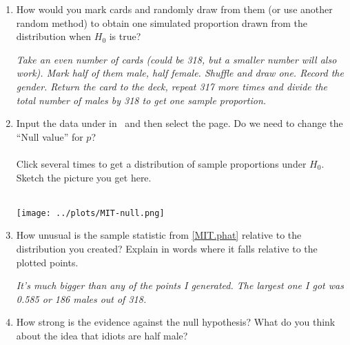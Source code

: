 \begin{enumerate}
\begin{enumerate}
\begin{key}
\end{key}
    \item How would you mark cards and randomly draw from them (or use
      another random method) to
      obtain one simulated proportion drawn from the distribution when
      $H_0$ is true?
\begin{students}
    \vspace{3cm}    
\end{students}
\begin{key} 
  {\it Take an even number of cards (could be 318, but a
    smaller number will also work). Mark half of them male, half
    female. Shuffle and draw one. Record the gender. Return the card
    to the deck, repeat 317 more times and divide the total number of
    males by 318 to get one sample proportion.}
\end{key}
    \item Input the data under  in 
      \webAppURLFrst\ 
      and then select the   page.  Do we need to change the
      ``Null value'' for $p$?\\ \ \\
      Click  several times to get a distribution of sample
      proportions under $H_0$. 
      Sketch the picture you get here.
\begin{students}
    \vspace{5cm}    
\end{students}
\begin{key}
\ \  \\ \texttt{[image: ../plots/MIT-null.png]}
\end{key}
  \item How unusual is the sample statistic from \ref{MIT.phat}
    relative to the distribution you created?  Explain in words where
    it falls relative to the plotted points.
\begin{students}
    \vspace{3cm}    
\end{students}

\begin{key}
{\it It's much bigger than any of the points I generated. The largest
  one I got was 0.585 or 186 males out of 318.}
\end{key} 
\item  How strong is the evidence against the null hypothesis?  What
  do you think about the idea that idiots are half male?
\begin{students}
    \vspace{2cm}    
\end{students}


\end{enumerate}
\end{enumerate}
